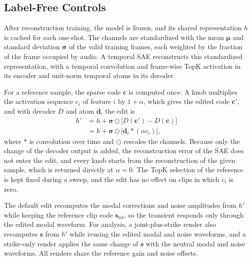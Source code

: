 \subsection{Label-Free Controls}
\label{sec:method-control}
After reconstruction training, the model is frozen, and its shared representation $h$ is cached for each one-shot.
The channels are standardized with the mean $\boldsymbol{\mu}$ and standard deviation $\boldsymbol{\sigma}$ of the valid training frames, each weighted by the fraction of the frame occupied by audio.
A temporal SAE reconstructs this standardized representation, with a temporal convolution and frame-wise TopK activation \citep{gao2025scaling} in its encoder and unit-norm temporal atoms in its decoder.

For a reference sample, the sparse code $\mathbf{c}$ is computed once.
A knob multiplies the activation sequence $c_i$ of feature $i$ by $1+\alpha$, which gives the edited code $\mathbf{c}'$, and with decoder $D$ and atom $\mathbf{d}_i$ the edit is
\begin{equation}
\begin{aligned}
h' &= h + \boldsymbol{\sigma}\odot\big[D(\mathbf{c}')-D(\mathbf{c})\big] \\
   &= h + \boldsymbol{\sigma}\odot\big[\mathbf{d}_i * (\alpha c_i)\big],
\end{aligned}
\label{eq:edit}
\end{equation}
where $*$ is convolution over time and $\odot$ rescales the channels.
Because only the change of the decoder output is added, the reconstruction error of the SAE does not enter the edit, and every knob starts from the reconstruction of the given sample, which is returned directly at $\alpha=0$.
The TopK selection of the reference is kept fixed during a sweep, and the edit has no effect on clips in which $c_i$ is zero.

The default edit recomputes the modal corrections and noise amplitudes from $h'$ while keeping the reference clip code $\mathbf{s}_{\mathrm{ref}}$, so the transient responds only through the edited modal waveform.
For analysis, a joint-plus-strike render also recomputes $\mathbf{s}$ from $h'$ while reusing the edited modal and noise waveforms, and a strike-only render applies the same change of $\mathbf{s}$ with the neutral modal and noise waveforms.
All renders share the reference gain and noise offsets.
